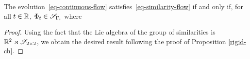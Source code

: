 \begin{prop}
	The evolution~\eqref{eq-continuous-flow} satisfies~\eqref{eq-similarity-flow} if and only if, for all $t \in \mathbb{R}$, $\Phi_t \in \mathcal{S}_{\Gamma_t}$ where  
\end{prop}
\begin{proof}
Using the fact that the Lie algebra of the group of similarities is ${\mathbb R}^2 \rtimes \mathcal{S}_{2 \times 2}$, we obtain the desired result following the proof of Proposition \ref{rigid-ch}. %

\end{proof}
